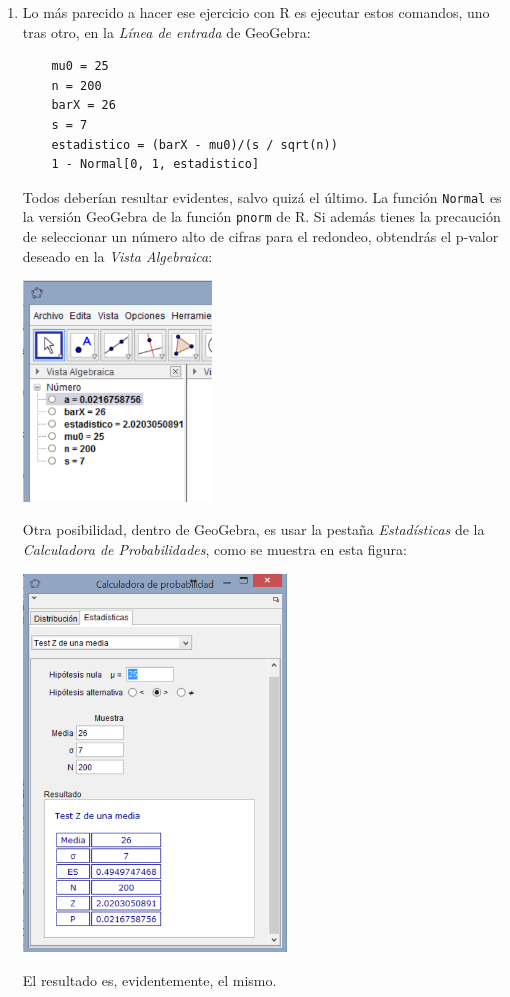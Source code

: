 \documentclass[10pt,a4paper]{article}\usepackage[]{graphicx}\usepackage[]{color}
\begin{document}
\begin{enumerate}
   \item Lo más parecido a hacer ese ejercicio con R es ejecutar estos comandos, uno tras otro, en la {\em Línea de entrada} de GeoGebra:
   \begin{verbatim}
    mu0 = 25
    n = 200
    barX = 26
    s = 7
    estadistico = (barX - mu0)/(s / sqrt(n))
    1 - Normal[0, 1, estadistico]
   \end{verbatim}
   Todos deberían resultar evidentes, salvo quizá el último. La función {\tt Normal} es la versión GeoGebra de la función {\tt pnorm} de R. Si además tienes la precaución de seleccionar un número alto de cifras para el redondeo, obtendrás el p-valor deseado en la {\em Vista Algebraica}:
    \begin{center}
	\includegraphics[width=5cm]{../fig/Tut07-12.png}
    \end{center}
   Otra posibilidad, dentro de GeoGebra, es usar la pestaña {\em Estadísticas} de la {\em Calculadora de Probabilidades}, como se muestra en esta figura:
    \begin{center}
	\includegraphics[width=7cm]{../fig/Tut07-13.png}
    \end{center}
   El resultado es, evidentemente, el mismo.

\end{enumerate}
\end{document}
